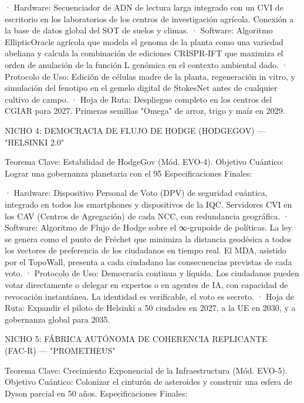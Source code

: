 \documentclass[12pt,a4paper]{book}
\begin{document}
· Hardware: Secuenciador de ADN de lectura larga integrado con un CVI de escritorio en los laboratorios de los centros de investigación agrícola. Conexión a la base de datos global del SOT de suelos y climas.
· Software: Algoritmo EllipticOracle agrícola que modela el genoma de la planta como una variedad abeliana y calcula la combinación de ediciones CRISPR‑IFT que maximiza el orden de anulación de la función L genómica en el contexto ambiental dado.
· Protocolo de Uso: Edición de células madre de la planta, regeneración in vitro, y simulación del fenotipo en el gemelo digital de StokesNet antes de cualquier cultivo de campo.
· Hoja de Ruta: Despliegue completo en los centros del CGIAR para 2027. Primeras semillas "Omega" de arroz, trigo y maíz en 2029.

NICHO 4: DEMOCRACIA DE FLUJO DE HODGE (HODGEGOV) — "HELSINKI 2.0"

Teorema Clave: Estabilidad de HodgeGov (Mód. EVO-4).
Objetivo Cuántico: Lograr una gobernanza planetaria con el 95%
Especificaciones Finales:

· Hardware: Dispositivo Personal de Voto (DPV) de seguridad cuántica, integrado en todos los smartphones y dispositivos de la IQC. Servidores CVI en los CAV (Centros de Agregación) de cada NCC, con redundancia geográfica.
· Software: Algoritmo de Flujo de Hodge sobre el ∞‑grupoide de políticas. La ley se genera como el punto de Fréchet que minimiza la distancia geodésica a todos los vectores de preferencia de los ciudadanos en tiempo real. El MDA, asistido por el TopoWall, presenta a cada ciudadano las consecuencias previstas de cada voto.
· Protocolo de Uso: Democracia continua y líquida. Los ciudadanos pueden votar directamente o delegar en expertos o en agentes de IA, con capacidad de revocación instantánea. La identidad es verificable, el voto es secreto.
· Hoja de Ruta: Expandir el piloto de Helsinki a 50 ciudades en 2027, a la UE en 2030, y a gobernanza global para 2035.

NICHO 5: FÁBRICA AUTÓNOMA DE COHERENCIA REPLICANTE (FAC‑R) — "PROMETHEUS"

Teorema Clave: Crecimiento Exponencial de la Infraestructura (Mód. EVO-5).
Objetivo Cuántico: Colonizar el cinturón de asteroides y construir una esfera de Dyson parcial en 50 años.
Especificaciones Finales:
\end{document}

